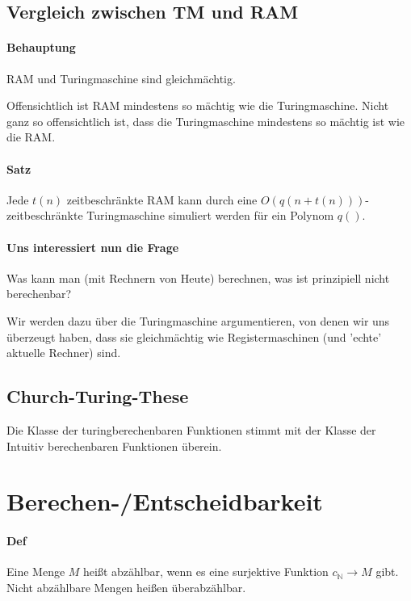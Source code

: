 \subsection{Vergleich zwischen TM und RAM}

\paragraph*{Behauptung} RAM und Turingmaschine sind gleichmächtig.

\par\medskip Offensichtlich ist RAM mindestens so mächtig wie die Turingmaschine. Nicht ganz so offensichtlich ist, dass die Turingmaschine mindestens so mächtig ist wie die RAM.\par\medskip

\paragraph*{Satz} Jede $t(n)$ zeitbeschränkte RAM kann durch eine $O(q(n+t(n)))$-zeitbeschränkte Turingmaschine simuliert werden für ein Polynom $q()$.

\paragraph*{Uns interessiert nun die Frage} Was kann man (mit Rechnern von Heute) berechnen, was ist prinzipiell nicht berechenbar?

\par\medskip Wir werden dazu über die Turingmaschine argumentieren, von denen wir uns überzeugt haben, dass sie gleichmächtig wie Registermaschinen (und 'echte' aktuelle Rechner) sind.\par\medskip

\subsection{Church-Turing-These}

Die Klasse der turingberechenbaren Funktionen stimmt mit der Klasse der Intuitiv berechenbaren Funktionen überein.

\section{Berechen-/Entscheidbarkeit}
\paragraph*{Def} Eine Menge $M$ heißt abzählbar, wenn es eine surjektive Funktion $c_\mathbb{N}\rightarrow M$ gibt. Nicht abzählbare Mengen heißen überabzählbar.


